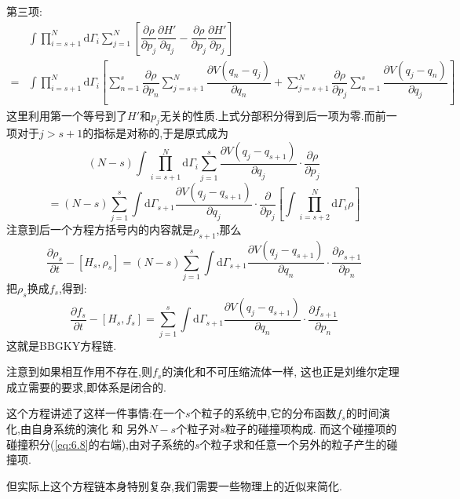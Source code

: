     第三项:
    \begin{align*}
      &\int \prod_{i=s+1}^{N} \mathrm{d} \Gamma_{i} \sum_{j=1}^{N}\left[ \dfrac{\partial \rho}{\partial p_{j}}\dfrac{\partial H'}{\partial q_{j}}-\dfrac{\partial \rho}{\partial p_{j}}\dfrac{\partial H'}{\partial p_{j}} \right]\\
      =&\int \prod_{i=s+1}^{N} \mathrm{d} \Gamma_{i} \left[ \sum_{n=1}^{s}\dfrac{\partial \rho}{\partial p_{n}}\sum_{j=s+1}^{N} \dfrac{\partial V(q_{n}-q_{j})}{\partial q_{n}}+\sum_{j=s+1}^{N} \dfrac{\partial \rho}{\partial p_{j}}\sum_{n=1}^{s}\dfrac{\partial V(q_{j}-q_{n})}{\partial q_{j}} \right]  
    \end{align*}
    这里利用第一个等号到了$H'$和$p_{j}$无关的性质.上式分部积分得到后一项为零.而前一项对于$j>s+1$的指标是对称的,于是原式成为
    \[(N-s)\int \prod_{i=s+1}^{N} \mathrm{d} \Gamma_{i} \sum_{j=1}^{s}\dfrac{\partial V(q_{j}-q_{s+1})}{\partial q_{j}}\cdot \dfrac{\partial \rho}{\partial p_{j}}\]
    \[=(N-s)\sum_{j=1}^{s}\int \mathrm{d} \Gamma_{s+1} \dfrac{\partial V(q_{j}-q_{s+1})}{\partial q_{j}}\cdot \dfrac{\partial }{\partial p_{j}}\left[ \int \prod_{i=s+2}^{N} \mathrm{d} \Gamma_{i}\rho \right] \]
    注意到后一个方程方括号内的内容就是$\rho_{s+1}$,那么
    \begin{equation}
      \dfrac{\partial \rho_{s}}{\partial t}-[H_{s},\rho_{s}]=(N-s)\sum _{j=1}^{s} \int \mathrm{d}  \Gamma_{s+1} \dfrac{\partial V(q_{j}-q_{s+1})}{\partial q_{n}}\cdot \dfrac{\partial \rho_{s+1}}{\partial p_{n}}
    \end{equation}
    把$\rho_{s}$换成$f_{s}$,得到:
    \begin{equation}
      \dfrac{\partial f_{s}}{\partial t}-[H_{s},f_{s}]=\sum _{j=1}^{s} \int \mathrm{d}  \Gamma_{s+1} \dfrac{\partial V(q_{j}-q_{s+1})}{\partial q_{n}}\cdot \dfrac{\partial f_{s+1}}{\partial p_{n}}
      \label{eq:6.8}
    \end{equation}
    这就是BBGKY方程链.
    
    注意到如果相互作用不存在,则$f_{s}$的演化和不可压缩流体一样, 这也正是刘维尔定理成立需要的要求,即体系是闭合的.

    这个方程讲述了这样一件事情:在一个$s$个粒子的系统中,它的分布函数$f_{s}$的时间演化,由自身系统的演化 和 另外$N-s$个粒子对$s$粒子的碰撞项构成. 而这个碰撞项的碰撞积分(\eqref{eq:6.8}的右端),由对子系统的$s$个粒子求和任意一个另外的粒子产生的碰撞项.

    但实际上这个方程链本身特别复杂,我们需要一些物理上的近似来简化.


